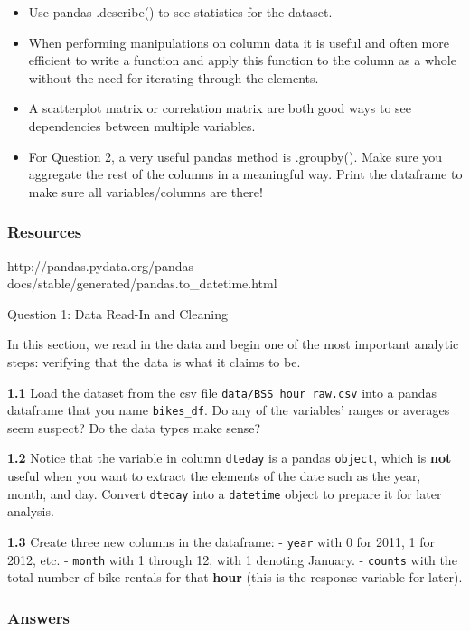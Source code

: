 \documentclass[11pt]{article}
\providecommand{\tightlist}{%
      \setlength{\itemsep}{0pt}\setlength{\parskip}{0pt}}
\begin{document}
\begin{itemize}
\tightlist
\item
  Use pandas .describe() to see statistics for the dataset.
\item
  When performing manipulations on column data it is useful and often
  more efficient to write a function and apply this function to the
  column as a whole without the need for iterating through the elements.
\item
  A scatterplot matrix or correlation matrix are both good ways to see
  dependencies between multiple variables.
\item
  For Question 2, a very useful pandas method is .groupby(). Make sure
  you aggregate the rest of the columns in a meaningful way. Print the
  dataframe to make sure all variables/columns are there!
\end{itemize}

\subsubsection{Resources}\label{resources}

http://pandas.pydata.org/pandas-docs/stable/generated/pandas.to\_datetime.html

     Question 1: Data Read-In and Cleaning

In this section, we read in the data and begin one of the most important
analytic steps: verifying that the data is what it claims to be.

\textbf{1.1} Load the dataset from the csv file
\texttt{data/BSS\_hour\_raw.csv} into a pandas dataframe that you name
\texttt{bikes\_df}. Do any of the variables' ranges or averages seem
suspect? Do the data types make sense?

\textbf{1.2} Notice that the variable in column \texttt{dteday} is a
pandas \texttt{object}, which is \textbf{not} useful when you want to
extract the elements of the date such as the year, month, and day.
Convert \texttt{dteday} into a \texttt{datetime} object to prepare it
for later analysis.

\textbf{1.3} Create three new columns in the dataframe: - \texttt{year}
with 0 for 2011, 1 for 2012, etc. - \texttt{month} with 1 through 12,
with 1 denoting January. - \texttt{counts} with the total number of bike
rentals for that \textbf{hour} (this is the response variable for
later).

    \subsubsection{Answers}\label{answers}
\end{document}
